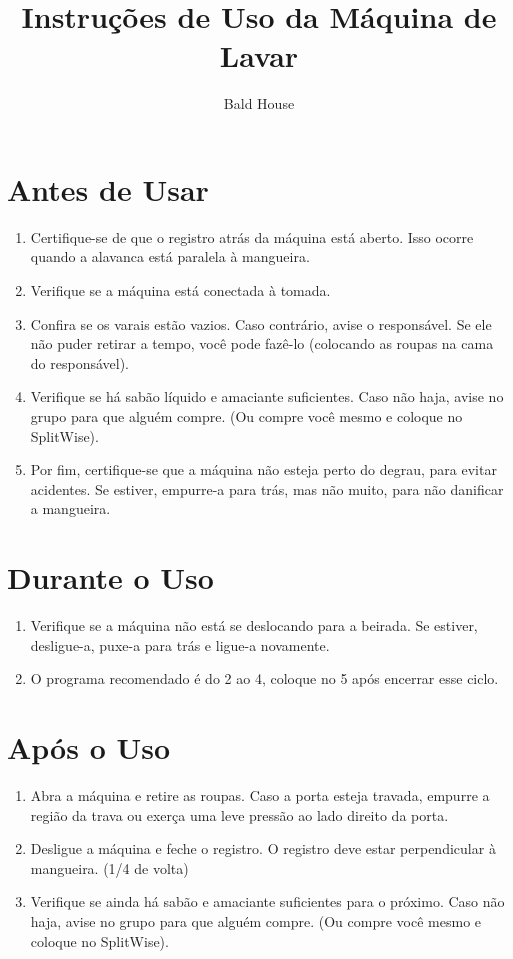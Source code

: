 \documentclass[12pt]{article}
\title{Instruções de Uso da Máquina de Lavar}
\author{Bald House}
\begin{document}
\maketitle
\thispagestyle{empty}

\section*{Antes de Usar}

\begin{enumerate}
    \item Certifique-se de que o registro atrás da máquina está aberto. Isso ocorre quando a alavanca está paralela à mangueira.
    \item Verifique se a máquina está conectada à tomada.
    \item Confira se os varais estão vazios. Caso contrário, avise o responsável. Se ele não puder retirar a tempo, você pode fazê-lo (colocando as roupas na cama do responsável).
    \item Verifique se há sabão líquido e amaciante suficientes. Caso não haja, avise no grupo para que alguém compre. (Ou compre você mesmo e coloque no SplitWise).
    \item Por fim, certifique-se que a máquina não esteja perto do degrau, para evitar acidentes. Se estiver, empurre-a para trás, mas não muito, para não danificar a mangueira.
\end{enumerate}

\section*{Durante o Uso}

\begin{enumerate}[start=6]
    \item Verifique se a máquina não está se deslocando para a beirada. Se estiver, desligue-a, puxe-a para trás e ligue-a novamente.
    \item O programa recomendado é do 2 ao 4, coloque no 5 após encerrar esse ciclo.
\end{enumerate}

\section*{Após o Uso}

\begin{enumerate}[start=8]
    \item Abra a máquina e retire as roupas. Caso a porta esteja travada, empurre a região da trava ou exerça uma leve pressão ao lado direito da porta.
    \item Desligue a máquina e feche o registro. O registro deve estar perpendicular à mangueira. (1/4 de volta)
    \item Verifique se ainda há sabão e amaciante suficientes para o próximo. Caso não haja, avise no grupo para que alguém compre. (Ou compre você mesmo e coloque no SplitWise).
\end{enumerate}
\end{document}
